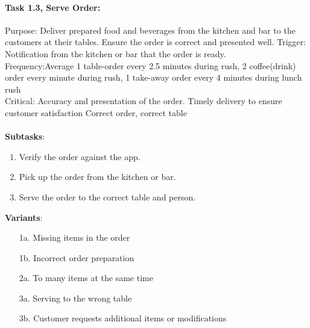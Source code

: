\documentclass{article}
\begin{document}
\paragraph{Task 1.3, Serve Order:}
Purpose: Deliver prepared food and beverages from the kitchen and bar to the customers at their tables. Ensure the order is correct and presented well.
Trigger: Notification from the kitchen or bar that the order is ready.\\
Frequency:Average 1 table-order every 2.5 minutes during rush, 2 coffee(drink) order every minute during rush, 1 take-away order  every 4 minutes during lunch rush \\
Critical: Accuracy and presentation of the order. Timely delivery to ensure customer satisfaction Correct order, correct table\\
\\
\textbf{Subtasks}:
\begin{enumerate}
    \item Verify the order against the app.
    \item Pick up the order from the kitchen or bar.
    \item Serve the order to the correct table and person.
\end{enumerate}
\textbf{Variants}:
\begin{enumerate}
    \item [1a.] Missing items in the order
    \item [1b.] Incorrect order preparation
    \item [2a.] To many items at the same time
    \item [3a.] Serving to the wrong table
    \item [3b.] Customer requests additional items or modifications
\end{enumerate}
\end{document}

